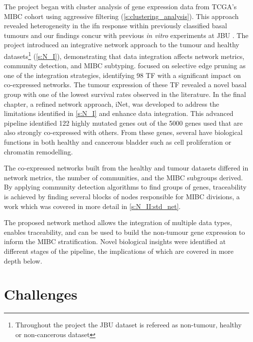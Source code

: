 The project began with cluster analysis of gene expression data from TCGA's MIBC cohort using aggressive filtering (\cref{s:clustering_analysis}). This approach revealed heterogeneity in the \acrlong{ifn} response within previously classified basal tumours \citep{Robertson2017-mg, Kamoun2020-tj} and our findings concur with previous \textit{in vitro} experiments at JBU \citep{Baker2022-bj}. The project introduced an integrative network approach to the tumour and healthy datasets\footnote{Throughout the project the JBU dataset is refereed as non-tumour, healthy or non-cancerous dataset} (\cref{s:N_I}), demonstrating that data integration affects network metrics, community detection, and MIBC subtyping.  focused on selective edge pruning as one of the integration strategies, identifying 98 TF with a significant impact on co-expressed networks. The tumour expression of these TF revealed a novel basal group with one of the lowest survival rates observed in the literature. In the final chapter, a refined network approach, iNet, was developed to address the limitations identified in \cref{s:N_I} and enhance data integration. This advanced pipeline identified 122 highly mutated genes out of the 5000 genes used that are also strongly co-expressed with others. From these genes, several have biological functions in both healthy and cancerous bladder such as cell proliferation or chromatin remodelling. 

The co-expressed networks built from the healthy and tumour datasets differed in network metrics, the number of communities, and the MIBC subgroups derived. By applying community detection algorithms to find groups of genes, traceability is achieved by finding several blocks of nodes responsible for MIBC divisions, a work which was covered in more detail in \cref{s:N_II:std_net}.

% 
The proposed network method allows the integration of multiple data types, enables traceability, and can be used to build the non-tumour gene expression to inform the MIBC stratification. Novel biological insights were identified at different stages of the pipeline, the implications of which are covered in more depth below.

\section{Challenges}

